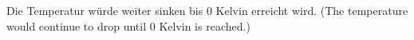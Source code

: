 Die Temperatur würde weiter sinken bis 0 Kelvin erreicht wird.  
(The temperature would continue to drop until 0 Kelvin is reached.)